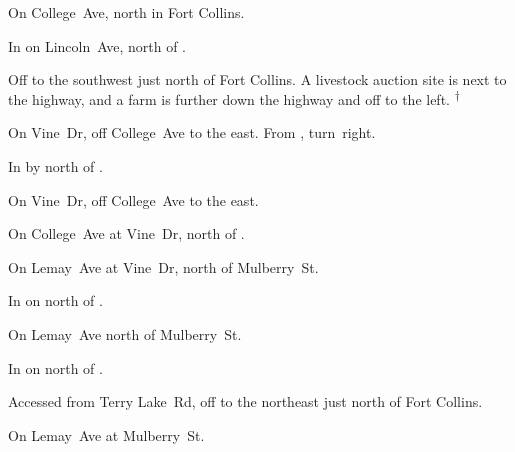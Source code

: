 

\begin{LocationList}

On  College~Ave, north in Fort Collins.

In  on  Lincoln~Ave, north of .

Off  to the southwest just north of Fort Collins.
A livestock auction site is next to the highway, and a farm is further down the highway and off to the left.%
\textsuperscript{\scriptsize $\dagger$}

On Vine~Dr, off  College~Ave to the east.
From , turn~right.

In  by  north of .

\Location{\GarageHQ \Garage}
On Vine~Dr, off  College~Ave to the east.

\Location{\GasStation \Gas}
On  College~Ave at Vine~Dr, north of .

On Lemay~Ave at Vine~Dr, north of  Mulberry~St.

\Location{\RecruitmentAgency \Recruitment}
In  on  north of .

\Location{\RestArea \Rest}
On Lemay~Ave north of  Mulberry~St.

In  on  north of .

Accessed from  Terry Lake~Rd, off  to the northeast just north of Fort Collins.

On Lemay~Ave at  Mulberry~St.

\end{LocationList}
